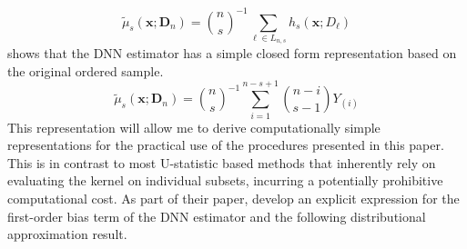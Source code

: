 \begin{equation}\label{eq:U_stat}
	\tilde{\mu}_{s}(\mathbf{x}; \mathbf{D}_n)
	= \binom{n}{s}^{-1} \sum_{\ell \in L_{n,s}} h_{s}(\mathbf{x}; D_{\ell})
\end{equation}
\citet{steele_exact_2009} shows that the DNN estimator has a simple closed form representation based on the original ordered sample.
\begin{equation}\label{eq:DNN_closed_form}
	\tilde{\mu}_{s}(\mathbf{x}; \mathbf{D}_n)
	= \binom{n}{s}^{-1} \sum_{i = 1}^{n - s + 1}\binom{n - i}{s - 1}Y_{(i)}
\end{equation}
This representation will allow me to derive computationally simple representations for the practical use of the procedures presented in this paper.
This is in contrast to most U-statistic based methods that inherently rely on evaluating the kernel on individual subsets, incurring a potentially prohibitive computational cost.
As part of their paper, \citet{demirkaya_optimal_2024} develop an explicit expression for the first-order bias term of the DNN estimator and the following distributional approximation result.
